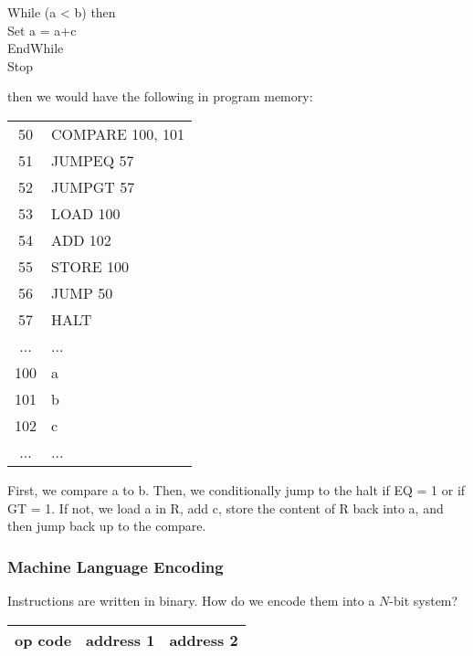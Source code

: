 \documentclass[]{article}
\begin{document}
\setlength{\parindent}{0.5cm}\noindent
While (a < b) then\\
\indent Set a = a+c\\
EndWhile\\
Stop\\
\setlength{\parindent}{0pt}

then we would have the following in program memory: \\

\begin{center}
	\begin{tabular}{c|l|}\cline{2-2}
		50 & COMPARE 100, 101 \\\cline{2-2}
		51 & JUMPEQ 57 \\\cline{2-2}
		52 & JUMPGT 57  \\\cline{2-2}
		53 & LOAD 100 \\\cline{2-2}
		54 & ADD 102 \\\cline{2-2}
		55 & STORE 100 \\\cline{2-2}
		56 & JUMP 50 \\\cline{2-2}
		57 & HALT \\\cline{2-2}
		... & ... \\\cline{2-2}
		100 & a \\\cline{2-2}
		101 & b \\\cline{2-2}
		102 & c \\\cline{2-2}
		... & ... \\\cline{2-2}
	\end{tabular}
	\bigbreak
\end{center}

First, we compare a to b. Then, we conditionally jump to the halt if EQ = 1 or if GT = 1. If not, we load a in R, add c, store the content of R back into a, and then jump back up to the compare. \\


\subsubsection{Machine Language Encoding}
\bigbreak

Instructions are written in binary. How do we encode them into a $N$-bit system?

\begin{center}
	\begin{tabular}{|c|c|c|}\hline
		op code & address 1 & address 2 \\\hline
	\end{tabular}
	\bigbreak
\end{center}
\end{document}
